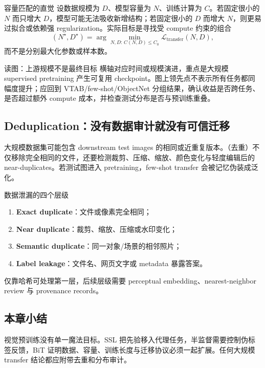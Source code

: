 \begin{importantbox}{容量匹配的直觉}
设数据规模为 $D$、模型容量为 $N$、训练计算为 $C$。若固定很小的 $N$ 而只增大 $D$，模型可能无法吸收新增结构；若固定很小的 $D$ 而增大 $N$，则更易过拟合或依赖强 regularization。实际目标是寻找受 compute 约束的组合
\[
(N^{\star},D^{\star})=\arg\min_{N,D:\,C(N,D)\le C_0}\mathcal{L}_{\text{transfer}}(N,D),
\]
而不是分别最大化参数或样本数。
\end{importantbox}


\begin{knowledgebox}{读图：上游规模不是最终目标}
横轴对应时间或规模演进，重点是大规模 supervised pretraining 产生可复用 checkpoint。图上领先点不表示所有任务都同幅度提升；应回到 VTAB/few-shot/ObjectNet 分组结果，确认收益是否跨任务、是否超过额外 compute 成本，并检查测试分布是否与预训练重叠。
\end{knowledgebox}


\subsection{Deduplication：没有数据审计就没有可信迁移}

大规模数据集可能包含 downstream test images 的相同或近重复版本。（去重）不仅移除完全相同的文件，还要检测裁剪、压缩、缩放、颜色变化与轻度编辑后的 near-duplicates。若测试图进入 pretraining，few-shot transfer 会被记忆伪装成泛化。


\begin{warningbox}{数据泄漏的四个层级}
\begin{enumerate}
  \item \textbf{Exact duplicate}：文件或像素完全相同；
  \item \textbf{Near duplicate}：裁剪、缩放、压缩或水印变化；
  \item \textbf{Semantic duplicate}：同一对象/场景的相邻照片；
  \item \textbf{Label leakage}：文件名、网页文字或 metadata 暴露答案。
\end{enumerate}
仅靠哈希可处理第一层，后续层级需要 perceptual embedding、nearest-neighbor review 与 provenance records。
\end{warningbox}

\subsection{本章小结}

视觉预训练没有单一魔法目标。SSL 把先验移入代理任务，半监督需要控制伪标签反馈，BiT 证明数据、容量、训练长度与迁移协议必须一起扩展。任何大规模 transfer 结论都应附带去重和分布审计。

